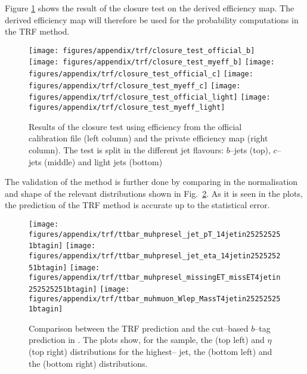 Figure \ref{fig:app:trfClosure} shows the result of the closure test
on the derived efficiency map.  The derived efficiency map will
therefore be used for the probability computations in the TRF method.
%
\begin{figure}\centering
    \texttt{[image: figures/appendix/trf/closure\_test\_official\_b]} 
    \texttt{[image: figures/appendix/trf/closure\_test\_myeff\_b]}
    \texttt{[image: figures/appendix/trf/closure\_test\_official\_c]}
    \texttt{[image: figures/appendix/trf/closure\_test\_myeff\_c]}
    \texttt{[image: figures/appendix/trf/closure\_test\_official\_light]} 
    \texttt{[image: figures/appendix/trf/closure\_test\_myeff\_light]}  
  \caption{Results of the closure test using efficiency from the
    official calibration file (left column) and the private efficiency
    map (right column). The test is split in the different jet
    flavours: $b$--jets (top), $c$--jets (middle) and light jets (bottom)
  }
  \label{fig:app:trfClosure}
\end{figure}

The validation of the method is further done by comparing in \alpgen{} the
normalisation and shape of the relevant distributions shown in
Fig.~\ref{fig:app:trfSpectra}.  As it is seen in the plots, the
prediction of the TRF method is accurate up to the statistical
error.
%
\begin{figure}\centering
\texttt{[image: figures/appendix/trf/ttbar\_muhpresel\_jet\_pT\_14jetin252525251btagin]}
\texttt{[image: figures/appendix/trf/ttbar\_muhpresel\_jet\_eta\_14jetin252525251btagin]}
\texttt{[image: figures/appendix/trf/ttbar\_muhpresel\_missingET\_missET4jetin252525251btagin]}
\texttt{[image: figures/appendix/trf/ttbar\_muhmuon\_Wlep\_MassT4jetin252525251btagin]}
  \caption{
    Comparison between the TRF prediction and the cut--based $b$--tag
    prediction in \alpgen{}.  The plots show, for the \ttbar{} \mujets{} sample,
    the \pt{} (top left) and $\eta$ (top right) distributions for the
    highest--\pt{} jet, the \met{} (bottom left) and the \mtw{}
    (bottom right) distributions.}
    \label{fig:app:trfSpectra}
\end{figure}

